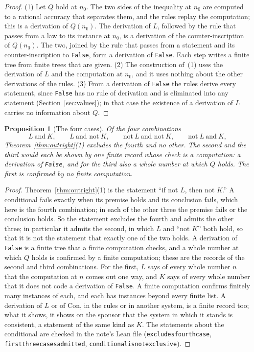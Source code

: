 \documentclass[11pt]{article}
\newtheorem{proposition}[theorem]{Proposition}
\theoremstyle{definition}
\theoremstyle{remark}
\DeclareRobustCommand{\lean}[1]{{\renewcommand{\_}{\textunderscore\allowbreak}\texttt{#1}}}
\newcommand{\False}{\lean{False}}
\begin{document}
\begin{proof}
(1) Let $Q$ hold at $n_0$. The two sides of the inequality at $n_0$ are computed to a rational accuracy that separates them, and the rules replay the computation; this is a derivation of $Q(n_0)$. The derivation of $L$, followed by the rule that passes from a law to its instance at $n_0$, is a derivation of the counter-inscription of $Q(n_0)$. The two, joined by the rule that passes from a statement and its counter-inscription to \False, form a derivation of \False. Each step writes a finite tree from finite trees that are given. (2) The construction of~(1) uses the derivation of $L$ and the computation at $n_0$, and it uses nothing about the other derivations of the rules. (3) From a derivation of \False{} the rules derive every statement, since \False{} has no rule of derivation and is eliminated into any statement (Section~\ref{sec:values}); in that case the existence of a derivation of $L$ carries no information about $Q$.
\end{proof}

\begin{proposition}[The four cases]\label{prop:fourcases}
Of the four combinations
\[
L\ \text{and}\ K,\qquad L\ \text{and not}\ K,\qquad \text{not}\ L\ \text{and not}\ K,\qquad \text{not}\ L\ \text{and}\ K,
\]
Theorem~\ref{thm:outright}(1) excludes the fourth and no other. The second and the third would each be shown by one finite record whose check is a computation: a derivation of \False, and for the third also a whole number at which $Q$ holds. The first is confirmed by no finite computation.
\end{proposition}

\begin{proof}
Theorem~\ref{thm:outright}(1) is the statement ``if not $L$, then not $K$.'' A conditional fails exactly when its premise holds and its conclusion fails, which here is the fourth combination; in each of the other three the premise fails or the conclusion holds. So the statement excludes the fourth and admits the other three; in particular it admits the second, in which $L$ and ``not $K$'' both hold, so that it is not the statement that exactly one of the two holds. A derivation of \False{} is a finite tree that a finite computation checks, and a whole number at which $Q$ holds is confirmed by a finite computation; these are the records of the second and third combinations. For the first, $L$ says of every whole number $n$ that the computation at $n$ comes out one way, and $K$ says of every whole number that it does not code a derivation of \False. A finite computation confirms finitely many instances of each, and each has instances beyond every finite list. A derivation of $L$ or of $\mathrm{Con}$, in the rules or in another system, is a finite record too; what it shows, it shows on the sponsor that the system in which it stands is consistent, a statement of the same kind as $K$. The statements about the conditional are checked in the note's Lean file (\lean{excludes\_fourth\_case}, \lean{first\_three\_cases\_admitted}, \lean{conditional\_is\_not\_exclusive}).
\end{proof}
\end{document}
